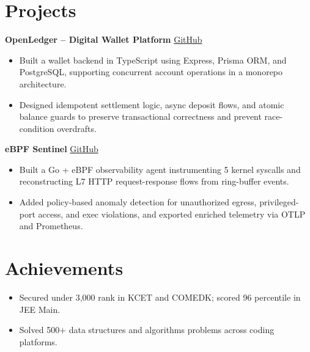 \documentclass[11pt]{article}
\begin{document}
\vspace{-10pt}

\section*{Projects}

\textbf{OpenLedger -- Digital Wallet Platform} \hfill \href{https://github.com/SIDDHAARTHAA/OpenLedger}{GitHub} \\
\vspace{-8pt}
\begin{itemize}
  \item Built a wallet backend in TypeScript using Express, Prisma ORM, and PostgreSQL, supporting concurrent account operations in a monorepo architecture.
  \item Designed idempotent settlement logic, async deposit flows, and atomic balance guards to preserve transactional correctness and prevent race-condition overdrafts.
\end{itemize}

\textbf{eBPF Sentinel} \hfill \href{https://github.com/SIDDHAARTHAA/ebpf-sentinel}{GitHub} \\
\vspace{-8pt}
\begin{itemize}
  \item Built a Go + eBPF observability agent instrumenting 5 kernel syscalls and reconstructing L7 HTTP request-response flows from ring-buffer events.
  \item Added policy-based anomaly detection for unauthorized egress, privileged-port access, and exec violations, and exported enriched telemetry via OTLP and Prometheus.
\end{itemize}

\vspace{-10pt}

\section*{Achievements}

\begin{itemize}
  \item Secured under 3,000 rank in KCET and COMEDK; scored 96 percentile in JEE Main.
  \item Solved 500+ data structures and algorithms problems across coding platforms.
\end{itemize}

\vspace{-10pt}
\end{document}
